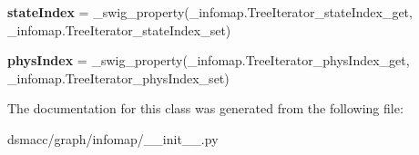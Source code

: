 \begin{DoxyCompactItemize}
\mbox{\label{classdsmacc_1_1graph_1_1infomap_1_1TreeIterator_a771f8ef6aa7119a98d5251b148fc9940}} 
{\bfseries state\+Index} = \+\_\+swig\+\_\+property(\+\_\+infomap.\+Tree\+Iterator\+\_\+state\+Index\+\_\+get, \+\_\+infomap.\+Tree\+Iterator\+\_\+state\+Index\+\_\+set)
\item 
\mbox{\label{classdsmacc_1_1graph_1_1infomap_1_1TreeIterator_ad2d481142921e6d66004e3acba305fe9}} 
{\bfseries phys\+Index} = \+\_\+swig\+\_\+property(\+\_\+infomap.\+Tree\+Iterator\+\_\+phys\+Index\+\_\+get, \+\_\+infomap.\+Tree\+Iterator\+\_\+phys\+Index\+\_\+set)
\end{DoxyCompactItemize}


The documentation for this class was generated from the following file\+:\begin{DoxyCompactItemize}
\item 
dsmacc/graph/infomap/\+\_\+\+\_\+init\+\_\+\+\_\+.\+py\end{DoxyCompactItemize}
